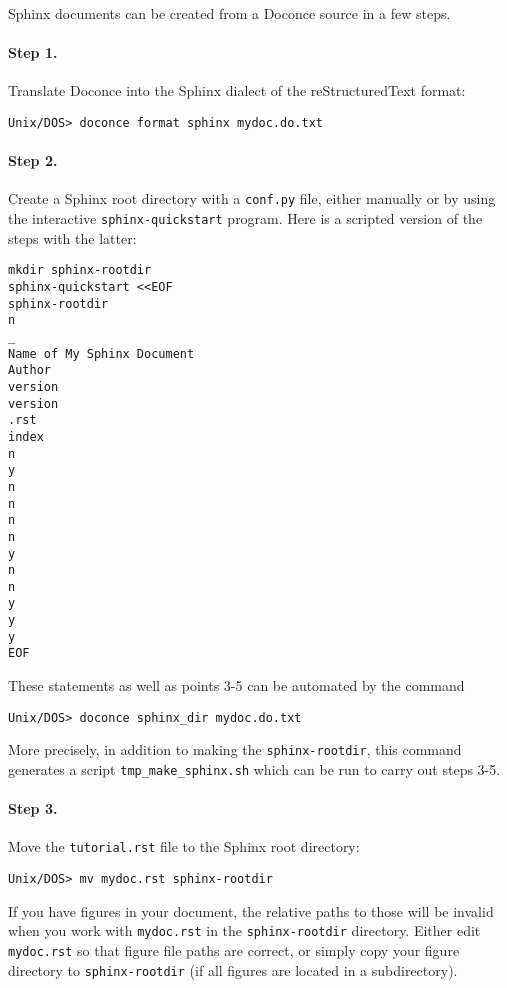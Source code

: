 \documentclass{article}
\begin{document}
Sphinx documents can be created from a Doconce source in a few steps.

\paragraph{Step 1.}
Translate Doconce into the Sphinx dialect of
the reStructuredText format:
\vspace{4pt}
\begin{Verbatim}[numbers=none,frame=lines,label=\fbox{{\tiny Terminal}},fontsize=\fontsize{9pt}{9pt},
labelposition=topline,framesep=2.5mm,framerule=0.7pt]
Unix/DOS> doconce format sphinx mydoc.do.txt
\end{Verbatim}

\paragraph{Step 2.}
Create a Sphinx root directory with a {\fontsize{10pt}{10pt}\verb!conf.py!} file, 
either manually or by using the interactive {\fontsize{10pt}{10pt}\verb!sphinx-quickstart!}
program. Here is a scripted version of the steps with the latter:
\vspace{4pt}
\begin{Verbatim}[numbers=none,frame=lines,label=\fbox{{\tiny Terminal}},fontsize=\fontsize{9pt}{9pt},
labelposition=topline,framesep=2.5mm,framerule=0.7pt]
mkdir sphinx-rootdir
sphinx-quickstart <<EOF
sphinx-rootdir
n
_
Name of My Sphinx Document
Author
version
version
.rst
index
n
y
n
n
n
n
y
n
n
y
y
y
EOF
\end{Verbatim}
These statements as well as points 3-5 can be automated by the command
\vspace{4pt}
\begin{Verbatim}[numbers=none,frame=lines,label=\fbox{{\tiny Terminal}},fontsize=\fontsize{9pt}{9pt},
labelposition=topline,framesep=2.5mm,framerule=0.7pt]
Unix/DOS> doconce sphinx_dir mydoc.do.txt
\end{Verbatim}
More precisely, in addition to making the {\fontsize{10pt}{10pt}\verb!sphinx-rootdir!},
this command generates a script {\fontsize{10pt}{10pt}\verb!tmp_make_sphinx.sh!} which
can be run to carry out steps 3-5.

\paragraph{Step 3.}
Move the {\fontsize{10pt}{10pt}\verb!tutorial.rst!} file to the Sphinx root directory:
\vspace{4pt}
\begin{Verbatim}[numbers=none,frame=lines,label=\fbox{{\tiny Terminal}},fontsize=\fontsize{9pt}{9pt},
labelposition=topline,framesep=2.5mm,framerule=0.7pt]
Unix/DOS> mv mydoc.rst sphinx-rootdir
\end{Verbatim}
If you have figures in your document, the relative paths to those will
be invalid when you work with {\fontsize{10pt}{10pt}\verb!mydoc.rst!} in the {\fontsize{10pt}{10pt}\verb!sphinx-rootdir!}
directory. Either edit {\fontsize{10pt}{10pt}\verb!mydoc.rst!} so that figure file paths are correct,
or simply copy your figure directory to {\fontsize{10pt}{10pt}\verb!sphinx-rootdir!} (if all figures
are located in a subdirectory).
\end{document}
